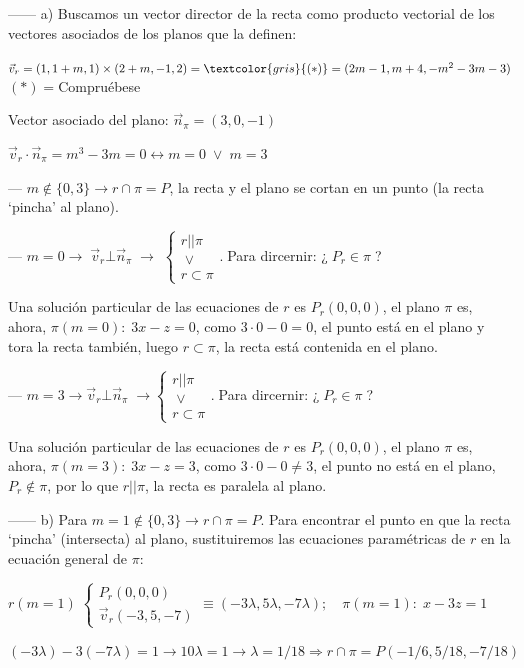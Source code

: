\begin{proofw}\renewcommand{\qedsymbol}{$\diamond$}
	------ a) Buscamos un vector director de la recta como producto vectorial de los vectores asociados de los planos que la definen:
	
\noindent $\vec v_r=(1,1+m,1) \times (2+m,-1,2)=\textcolor{gris}{ (*)}=(2m-1,m+4,-m^2-3m-3)$ \textcolor{gris}{$(*)=$Compruébese} 

\noindent Vector asociado del plano: $\vec n_{\pi}=(3,0,-1)$

\noindent $\vec v_r \cdot \vec n_{\pi}=m^3-3m=0\leftrightarrow m=0\; \vee \; m=3$

\noindent --- $m\notin \{0,3\} \to r\cap \pi=P$, la recta y el plano se cortan en un punto (la recta `pincha' al plano).

\noindent --- $m=0 \to \; \vec v_r \bot \vec n_{\pi} \; \to $
\footnotesize{$ \begin{cases} r||\pi \\ \; \vee \\ r\subset \pi \end{cases}.\;$}\normalsize{Para} dircernir: ¿$\;P_r\in\pi\;$?

\noindent Una solución particular de las ecuaciones de $r$ es $P_r(0,0,0)$, el plano $\pi$ es, ahora, $\pi(m=0):\; 3x-z=0$, como $3\cdot 0-0=0$, el punto está en el plano y tora la recta también, luego $r \subset \pi$, la recta está contenida en el plano.

\noindent --- $m=3 \to  \vec v_r \bot \vec n_{\pi} \; \to $\footnotesize{$ \begin{cases} r||\pi \\ \; \vee \\ r\subset \pi \end{cases}.\;$}\normalsize{Para} dircernir: ¿$\;P_r\in\pi\;$?

\noindent Una solución particular de las ecuaciones de $r$ es $P_r(0,0,0)$, el plano $\pi$ es, ahora, $\pi(m=3):\; 3x-z=3$, como $3\cdot 0-0\neq 3$, el punto no está en el plano, $P_r \notin \pi$, por lo que $r||\pi$, la recta es paralela al plano.	

\noindent  ------ b) Para $m=1 \notin \{0,3\} \to r\cap \pi=P$. Para encontrar el punto en que la recta `pincha' (intersecta) al plano, sustituiremos las ecuaciones paramétricas de $r$ en la ecuación general de $\pi$:

\noindent $r(m=1)\; \begin{cases} P_r(0,0,0) \\ \vec v_r(-3,5,-7) \end{cases} \equiv (-3\lambda, 5 \lambda, -7\lambda); \quad \pi(m=1):\;x-3z=1$

\noindent $(-3\lambda)-3(-7\lambda)=1 \to 10\lambda=1 \to \lambda=1/18 \Rightarrow r\cap \pi=P(-1/6,5/18,-7/18)$

\end{proofw}


